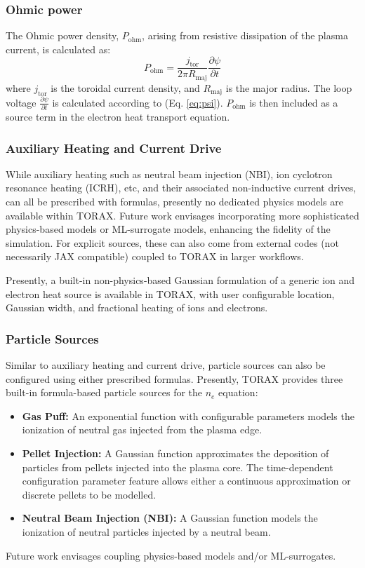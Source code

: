 \documentclass[aps, reprint, nofootinbib]{revtex4-2}
\begin{document}
\subsubsection{Ohmic power}
The Ohmic power density, $P_\mathrm{ohm}$, arising from resistive dissipation of the plasma current, is calculated as:
\begin{equation}
P_\mathrm{ohm} = \frac{j_\mathrm{tor} }{2 \pi R_\mathrm{maj}}\frac{\partial \psi}{\partial t}
\end{equation}
where $j_\mathrm{tor}$ is the toroidal current density, and $R_\mathrm{maj}$ is the major radius. The loop voltage $\frac{\partial \psi}{\partial t}$ is calculated according to (Eq. \ref{eq:psi}). $P_\mathrm{ohm}$ is then included as a source term in the electron heat transport equation.

\subsubsection{Auxiliary Heating and Current Drive}
While auxiliary heating such as neutral beam injection (NBI), ion cyclotron resonance heating (ICRH), etc, and their associated non-inductive current drives, can all be prescribed with formulas, presently no dedicated physics models are available within TORAX. Future work envisages incorporating more sophisticated physics-based models or ML-surrogate models, enhancing the fidelity of the simulation. For explicit sources, these can also come from external codes (not necessarily JAX compatible) coupled to TORAX in larger workflows. 

Presently, a built-in non-physics-based Gaussian formulation of a generic ion and electron heat source is available in TORAX, with user configurable location, Gaussian width, and fractional heating of ions and electrons.

\subsubsection{Particle Sources}
Similar to auxiliary heating and current drive, particle sources can also be configured using either prescribed formulas. Presently, TORAX provides three built-in formula-based particle sources for the $n_e$ equation:
\begin{itemize}
\item \textbf{Gas Puff:} An exponential function with configurable parameters models the ionization of neutral gas injected from the plasma edge.
\item \textbf{Pellet Injection:} A Gaussian function approximates the deposition of particles from pellets injected into the plasma core. The time-dependent configuration parameter feature allows either a continuous approximation or discrete pellets to be modelled.
\item \textbf{Neutral Beam Injection (NBI):}  A Gaussian function models the ionization of neutral particles injected by a neutral beam.
\end{itemize}
Future work envisages coupling physics-based models and/or ML-surrogates.
\end{document}
